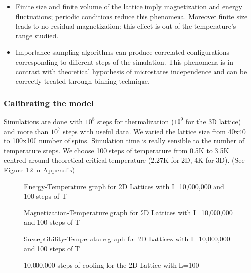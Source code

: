 \documentclass[11pt,a4paper]{article}
\begin{document}
\begin{itemize}
\item Finite size and finite volume of the lattice imply magnetization and energy fluctuations; periodic conditions reduce this phenomena. Moreover finite size leads to no residual magnetization: this effect is out of the temperature's range studied.

\item Importance sampling algorithms can produce correlated configurations corresponding to different steps of the simulation. This phenomena is in contrast with theoretical hypothesis of microstates independence and can be correctly treated through binning technique. 
\end{itemize}

\subsubsection*{Calibrating the model}
Simulations are done with $10^8$ steps for thermalization ($10^9$ for the 3D lattice) and more than $10^7$ steps with useful data. We varied the lattice size from 40x40 to 100x100 number of spins. Simulation time is really sensible to the number of temperature steps. We choose 100 steps of temperature from 0.5K to 3.5K centred around theoretical critical temperature (2.27K for 2D, 4K for 3D). (See Figure 12 in Appendix) 

\begin{figure}[h!]
  \centering
  
  \caption{Energy-Temperature graph for 2D Lattices with I=10,000,000 and 100 steps of T}
\end{figure}

\begin{figure}[h!]
  \centering

  \caption{Magnetization-Temperature graph for 2D Lattices with I=10,000,000 and 100 steps of T}
\end{figure}

\begin{figure}[h!]
  \centering
 
  \caption{Susceptibility-Temperature graph for 2D Lattices with I=10,000,000 and 100 steps of T}
\end{figure}

\begin{figure}[h!]
  \centering
  
  \caption{10,000,000 steps of cooling for the 2D Lattice with L=100}
\end{figure}
\end{document}
